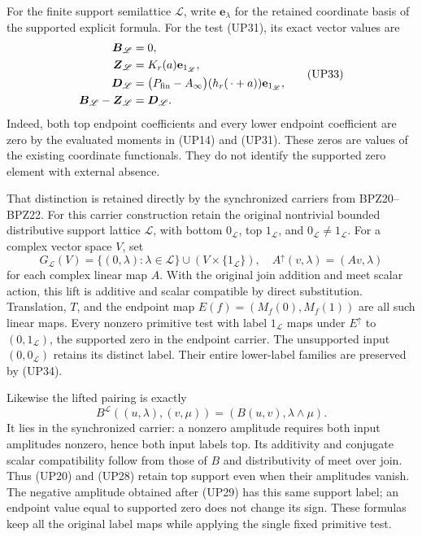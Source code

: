 \documentclass[
  10pt,
  a4paper,
]{article}
\begin{document}
For the finite support semilattice \(\mathscr L\), write
\(\mathbf e_\lambda\) for the retained coordinate basis of the supported
explicit formula. For the test (UP31), its exact vector values are \[
\begin{aligned}
\boldsymbol B_{\mathscr L}&=0,\\
\boldsymbol Z_{\mathscr L}&=K_r(a)\mathbf e_{1_{\mathscr L}},\\
\boldsymbol D_{\mathscr L}
&=\bigl(P_{\rm fin}-A_\infty\bigr)(h_r(\,\cdot+a))
\mathbf e_{1_{\mathscr L}},\\
\boldsymbol B_{\mathscr L}-\boldsymbol Z_{\mathscr L}
&=\boldsymbol D_{\mathscr L}.
\end{aligned}
\tag{UP33}
\] Indeed, both top endpoint coefficients and every lower endpoint
coefficient are zero by the evaluated moments in (UP14) and (UP31).
These zeros are values of the existing coordinate functionals. They do
not identify the supported zero element with external absence.

That distinction is retained directly by the synchronized carriers from
BPZ20--BPZ22. For this carrier construction retain the original
nontrivial bounded distributive support lattice \(\mathscr L\), with
bottom \(0_{\mathscr L}\), top \(1_{\mathscr L}\), and
\(0_{\mathscr L}\ne1_{\mathscr L}\). For a complex vector space \(V\),
set \[
G_{\mathscr L}(V)
=\{(0,\lambda):\lambda\in\mathscr L\}
\cup(V\times\{1_{\mathscr L}\}),
\quad A^\uparrow(v,\lambda)=(Av,\lambda)
\tag{UP34}
\] for each complex linear map \(A\). With the original join addition
and meet scalar action, this lift is additive and scalar compatible by
direct substitution. Translation, \(T\), and the endpoint map
\(E(f)=(M_f(0),M_f(1))\) are all such linear maps. Every nonzero
primitive test with label \(1_{\mathscr L}\) maps under \(E^\uparrow\)
to \((0,1_{\mathscr L})\), the supported zero in the endpoint carrier.
The unsupported input \((0,0_{\mathscr L})\) retains its distinct label.
Their entire lower-label families are preserved by (UP34).

Likewise the lifted pairing is exactly \[
B^{\mathscr L}((u,\lambda),(v,\mu))
=(B(u,v),\lambda\wedge\mu).
\tag{UP35}
\] It lies in the synchronized carrier: a nonzero amplitude requires
both input amplitudes nonzero, hence both input labels top. Its
additivity and conjugate scalar compatibility follow from those of \(B\)
and distributivity of meet over join. Thus (UP20) and (UP28) retain top
support even when their amplitudes vanish. The negative amplitude
obtained after (UP29) has this same support label; an endpoint value
equal to supported zero does not change its sign. These formulas keep
all the original label maps while applying the single fixed primitive
test.
\end{document}
